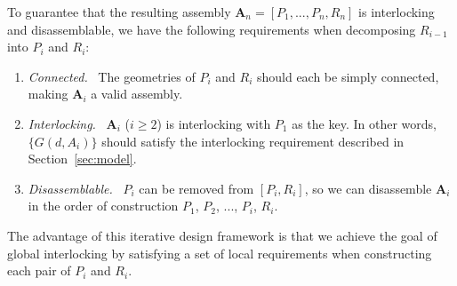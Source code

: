 To guarantee that the resulting assembly $\mathbf{A}_n = [P_1, ..., P_n, R_n]$ is interlocking and disassemblable, we have the following requirements when decomposing $R_{i-1}$ into $P_i$ and $R_i$:
\begin{enumerate}[label=(\roman*), leftmargin=*]
	\vspace*{-0.5mm}
	\item
	{\em  Connected.} \
   The geometries of $P_i$ and $R_i$ should each be simply connected, making $\mathbf{A}_i$ a valid assembly. 
   
   	\vspace*{0.5mm}
    \item
   {\em Interlocking.} \
   $\mathbf{A}_i$ ($i\geq2$) is interlocking with $P_1$ as the key.
   In other words, $\{G(d, A_i)\}$ should satisfy the interlocking requirement described in Section~\ref{sec:model}.

   	\vspace*{0.5mm}
   	\item
   	{\em Disassemblable.} \
   	$P_i$ can be removed from $[P_i, R_i]$, so we can disassemble $\mathbf{A}_i$ in the order of construction $P_1$, $P_2$,  $...$,  $P_i$, $R_i$.
   	
\end{enumerate}	
\vspace*{-0.5mm}
\noindent
The advantage of this iterative design framework is that we achieve the goal of global interlocking by satisfying a set of local requirements when constructing each pair of $P_i$ and $R_i$.

